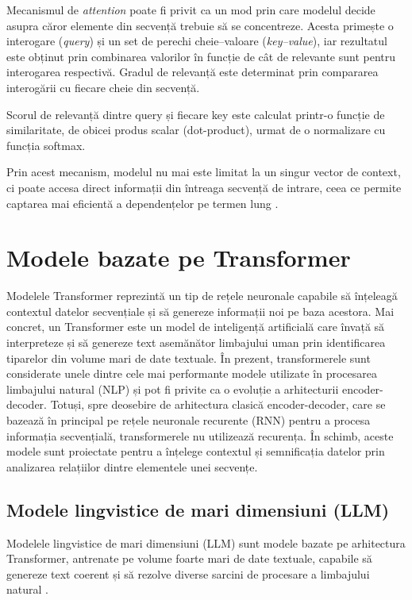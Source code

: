 \documentclass[12pt, a4paper, oneside, romanian]{teza-upb}
\begin{document}
Mecanismul de \textit{attention} poate fi privit ca un mod prin care
modelul decide asupra căror elemente din secvență trebuie să se
concentreze. Acesta primește o interogare (\textit{query}) și un set
de perechi cheie–valoare (\textit{key–value}), iar rezultatul este
obținut prin combinarea valorilor în funcție de cât de relevante sunt
pentru interogarea respectivă. Gradul de relevanță este determinat
prin compararea interogării cu fiecare cheie din secvență. 

Scorul de relevanță dintre query și fiecare key este calculat printr-o funcție de similaritate, de obicei produs scalar (dot-product), urmat de o normalizare cu funcția softmax.

Prin acest mecanism, modelul nu mai este limitat la un singur vector de context, ci poate accesa direct informații din întreaga secvență de intrare, ceea ce permite captarea mai eficientă a dependențelor pe termen lung \cite{vaswani2017attention}.
    
\section{Modele bazate pe Transformer}

Modelele Transformer reprezintă un tip de rețele neuronale capabile să înțeleagă contextul datelor secvențiale și să genereze informații noi pe baza acestora. Mai concret, un Transformer este un model de inteligență artificială care învață să interpreteze și să genereze text asemănător limbajului uman prin identificarea tiparelor din volume mari de date textuale. În prezent, transformerele sunt considerate unele dintre cele mai performante modele utilizate în procesarea limbajului natural (NLP) și pot fi privite ca o evoluție a arhitecturii encoder-decoder. Totuși, spre deosebire de arhitectura clasică encoder-decoder, care se bazează în principal pe rețele neuronale recurente (RNN) pentru a procesa informația secvențială, transformerele nu utilizează recurența. În schimb, aceste modele sunt proiectate pentru a înțelege contextul și semnificația datelor prin analizarea relațiilor dintre elementele unei secvențe. \cite{datacamp}

    \subsection{Modele lingvistice de mari dimensiuni (LLM)}

Modelele lingvistice de mari dimensiuni (LLM) sunt modele bazate pe arhitectura Transformer, antrenate pe volume foarte mari de date textuale, capabile să genereze text coerent și să rezolve diverse sarcini de procesare a limbajului natural \cite{brown2020language}.
\end{document}

